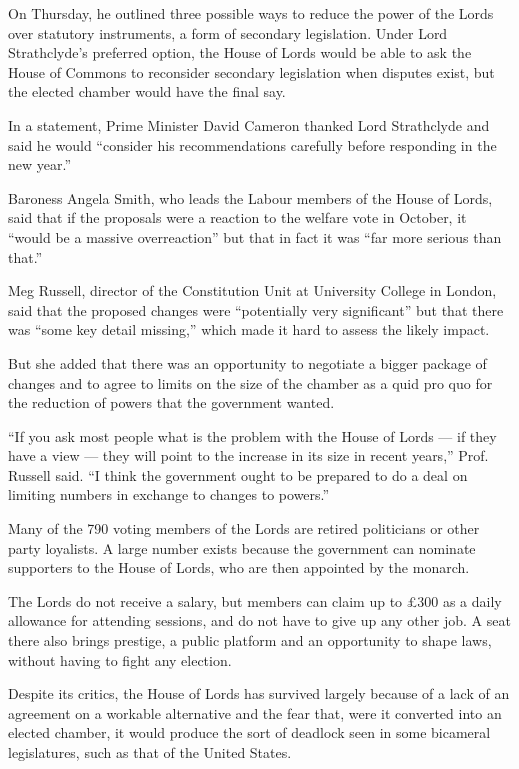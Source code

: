 On Thursday, he outlined three possible ways to reduce the power of the
Lords over statutory instruments, a form of secondary legislation. Under
Lord Strathclyde's preferred option, the House of Lords would be able to
ask the House of Commons to reconsider secondary legislation when
disputes exist, but the elected chamber would have the final say.

In a statement, Prime Minister David Cameron thanked Lord Strathclyde
and said he would ``consider his recommendations carefully before
responding in the new year.''

Baroness Angela Smith, who leads the Labour members of the House of
Lords, said that if the proposals were a reaction to the welfare vote in
October, it ``would be a massive overreaction'' but that in fact it was
``far more serious than that.''

Meg Russell, director of the Constitution Unit at University College in
London, said that the proposed changes were ``potentially very
significant'' but that there was ``some key detail missing,'' which made
it hard to assess the likely impact.

But she added that there was an opportunity to negotiate a bigger
package of changes and to agree to limits on the size of the chamber as
a quid pro quo for the reduction of powers that the government wanted.

``If you ask most people what is the problem with the House of Lords ---
if they have a view --- they will point to the increase in its size in
recent years,'' Prof. Russell said. ``I think the government ought to be
prepared to do a deal on limiting numbers in exchange to changes to
powers.''

Many of the 790 voting members of the Lords are retired politicians or
other party loyalists. A large number exists because the government can
nominate supporters to the House of Lords, who are then appointed by the
monarch.

The Lords do not receive a salary, but members can claim up to £300 as a
daily allowance for attending sessions, and do not have to give up any
other job. A seat there also brings prestige, a public platform and an
opportunity to shape laws, without having to fight any election.

Despite its critics, the House of Lords has survived largely because of
a lack of an agreement on a workable alternative and the fear that, were
it converted into an elected chamber, it would produce the sort of
deadlock seen in some bicameral legislatures, such as that of the United
States.

